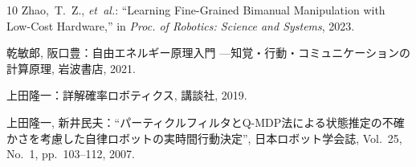 \documentclass[twocolumn]{jarticle} %
\begin{document}
\begin{thebibliography}{10}
Zhao,~T.~Z., {\it et~al.}: ``{Learning Fine-Grained
  Bimanual Manipulation with Low-Cost Hardware},'' in {\em Proc. of Robotics:
  Science and Systems}, 2023.

{}乾敏郎,
  阪口豊：自由エネルギー原理入門 ---知覚・行動・コミュニケーションの計算原理,
  岩波書店, 2021.

{}上田隆一：詳解確率ロボティクス, 講談社, 2019.

{}上田隆一,
  新井民夫：``{パーティクルフィルタとQ-MDP法による状態推定の不確かさを考慮した自律ロボットの実時間行動決定}'',
  日本ロボット学会誌, Vol.~25, No.~1, pp.~103--112, 2007.

\end{thebibliography}

%
\end{document}
